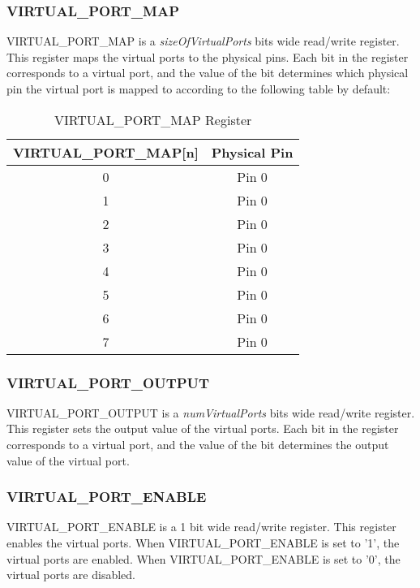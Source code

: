 \subsubsection{VIRTUAL\_PORT\_MAP}
VIRTUAL\_PORT\_MAP is a \textit{sizeOfVirtualPorts} bits wide read/write register. This register maps the virtual ports to the physical pins.
Each bit in the register corresponds to a virtual port, and the value of the bit determines which physical pin the virtual port is mapped to 
according to the following table by default:
\begin{table}[h]
  \centering
  \begin{tabular}{|c|c|}
      \hline
      \textbf{VIRTUAL\_PORT\_MAP[n]} & \textbf{Physical Pin} \\ \hline
      0 & Pin 0 \\ \hline
      1 & Pin 0 \\ \hline
      2 & Pin 0 \\ \hline
      3 & Pin 0 \\ \hline
      4 & Pin 0 \\ \hline
      5 & Pin 0 \\ \hline
      6 & Pin 0 \\ \hline
      7 & Pin 0 \\ \hline
  \end{tabular}
  \caption{VIRTUAL\_PORT\_MAP Register}
\end{table}

\subsubsection{VIRTUAL\_PORT\_OUTPUT}
VIRTUAL\_PORT\_OUTPUT is a \textit{numVirtualPorts} bits wide read/write register. This register sets the output value of the virtual ports.
Each bit in the register corresponds to a virtual port, and the value of the bit determines the output value of the virtual port.

\subsubsection{VIRTUAL\_PORT\_ENABLE}
VIRTUAL\_PORT\_ENABLE is a 1 bit wide read/write register. This register enables the virtual ports. When VIRTUAL\_PORT\_ENABLE is set to '1', the virtual ports are enabled.
When VIRTUAL\_PORT\_ENABLE is set to '0', the virtual ports are disabled.

